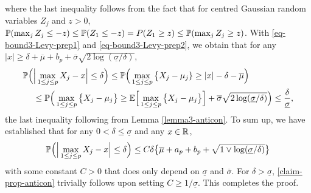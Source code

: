 \documentclass[a4paper,12pt]{article}
\begin{document}
where the last inequality follows from the fact that for centred Gaussian random variables $Z_j$ and $z > 0$, $\mathbb{P}(\max_j Z_j \le - z) \le \mathbb{P}(Z_1 \le -z) = P(Z_1 \ge z) \le \mathbb{P}(\max_j Z_j \ge z)$. With \eqref{eq-bound3-Levy-prep1} and \eqref{eq-bound3-Levy-prep2}, we obtain that for any $|x| \ge \delta + \overline{\mu} + b_p + \overline{\sigma}\sqrt{2\log(\underline{\sigma}/\delta)}$,
\begin{align*} 
\mathbb{P} \Big( & \Big| \max_{1 \le j \le p} X_j - x \Big| \le \delta \Big) \le \mathbb{P} \Big( \max_{1 \le j \le p} \big\{ X_j - \mu_j \} \ge |x| - \delta - \overline{\mu} \Big) \\
 & \le \mathbb{P} \Big( \max_{1 \le j \le p} \big\{ X_j - \mu_j \big\} \ge \mathbb{E} \Big[ \max_{1 \le j \le p} \big\{ X_j-\mu_j \big\} \Big] + \overline{\sigma} \sqrt{2\log(\underline{\sigma}/\delta)} \Big) \le \frac{\delta}{\underline{\sigma}}, 
\end{align*}
the last inequality following from Lemma \ref{lemma3-anticon}. To sum up, we have established that for any $0 < \delta \le \underline{\sigma}$ and any $x \in \mathbb{R}$, 
\begin{equation}\label{claim-prop-anticon}
\mathbb{P} \Big( \Big| \max_{1 \le j \le p} X_j - x \Big| \le \delta \Big) \le C \delta \big\{ \overline{\mu} + a_p + b_p + \sqrt{1 \vee \log(\underline{\sigma}/\delta)} \big\} 
\end{equation}
with some constant $C > 0$ that does only depend on $\underline{\sigma}$ and $\overline{\sigma}$. For $\delta > \underline{\sigma}$, \eqref{claim-prop-anticon} trivially follows upon setting $C \ge 1/\underline{\sigma}$. This completes the proof. 




{\small
\setlength{\bibsep}{0.55em}
}
\end{document}
